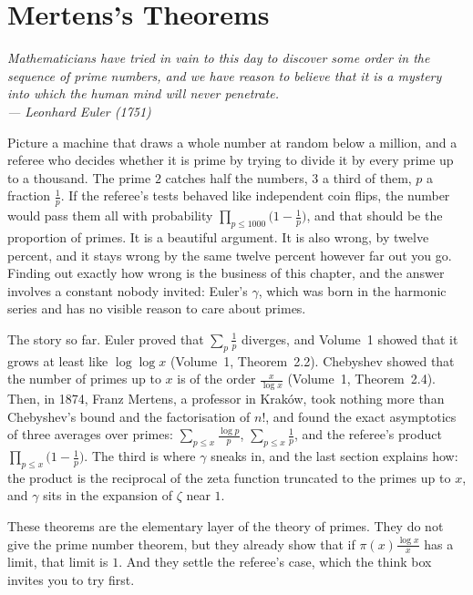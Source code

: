 \chapter{Mertens's Theorems}

\begin{center}\itshape
Mathematicians have tried in vain to this day to discover some order in the sequence of prime numbers, and we have
reason to believe that it is a mystery into which the human mind will never penetrate.\\
\upshape --- Leonhard Euler (1751)
\end{center}

Picture a machine that draws a whole number at random below a million, and a referee who decides whether it is prime by
trying to divide it by every prime up to a thousand. The prime $2$ catches half the numbers, $3$ a third of them, $p$ a fraction
$\frac1p$. If the referee's tests behaved like independent coin flips, the number would pass them all with probability
$\prod_{p\le1000}\bigl(1-\frac1p\bigr)$, and that should be the proportion of primes. It is a beautiful argument. It is also wrong, by twelve
percent, and it stays wrong by the same twelve percent however far out you go. Finding out exactly how wrong is the business of this chapter,
and the answer involves a constant nobody invited: Euler's $\gamma$, which was born in the harmonic series and has no visible
reason to care about primes.

The story so far. Euler proved that $\sum_p\frac1p$ diverges, and Volume~1 showed that it grows at least like $\log\log x$ (Volume~1, Theorem~2.2).
Chebyshev showed that the number of primes up to $x$ is of the order $\frac x{\log x}$ (Volume~1, Theorem~2.4). Then, in 1874, Franz Mertens, a
professor in Krak\'ow, took nothing more than Chebyshev's bound and the factorisation of $n!$, and found the exact asymptotics of three averages
over primes: $\sum_{p\le x}\frac{\log p}p$, $\sum_{p\le x}\frac1p$, and the referee's product $\prod_{p\le x}\bigl(1-\frac1p\bigr)$. The third is where $\gamma$
sneaks in, and the last section explains how: the product is the reciprocal of the zeta function truncated to the primes up to $x$, and $\gamma$
sits in the expansion of $\zeta$ near $1$.

These theorems are the elementary layer of the theory of primes. They do not give the prime number theorem, but they already
show that if $\pi(x)\frac{\log x}x$ has a limit, that limit is $1$. And they settle the referee's case, which the think box invites you to try first.

